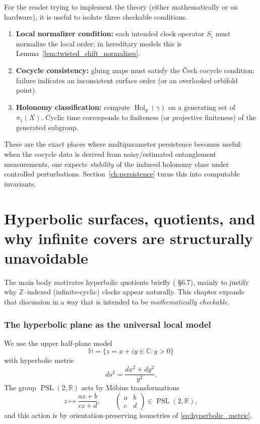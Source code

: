\documentclass[11pt,oneside]{amsbook}
\numberwithin{equation}{section}
\theoremstyle{plain}
\theoremstyle{definition}
\theoremstyle{remark}
\newcommand{\HH}{\mathbb{H}}
\newcommand{\Z}{\mathbb{Z}}
\newcommand{\R}{\mathbb{R}}
\newcommand{\C}{\mathbb{C}}
\DeclareMathOperator{\Hol}{\mathrm{Hol}}
\DeclareMathOperator{\PSL}{\mathrm{PSL}}
\begin{document}
For the reader trying to implement the theory (either mathematically or on hardware), it is useful to isolate three checkable conditions.

\begin{enumerate}
\item \textbf{Local normalizer condition:} each intended clock operator $S_i$ must normalize the local order; in hereditary models this is Lemma~\ref{lem:twisted_shift_normalizes}.
\item \textbf{Cocycle consistency:} gluing maps must satisfy the \v{C}ech cocycle condition; failure indicates an inconsistent surface order (or an overlooked orbifold point).
\item \textbf{Holonomy classification:} compute $\Hol_g(\gamma)$ on a generating set of $\pi_1(X)$.
Cyclic time corresponds to finiteness (or projective finiteness) of the generated subgroup.
\end{enumerate}

These are the exact places where multiparameter persistence becomes useful:
when the cocycle data is derived from noisy/estimated entanglement measurements, one expects \emph{stability} of the induced holonomy class under controlled perturbations.
Section~\ref{ch:persistence} turns this into computable invariants.

\chapter{Hyperbolic surfaces, quotients, and why infinite covers are structurally unavoidable}

\label{ch:hyperbolic}


The  main body motivates hyperbolic quotients briefly ( \S6.7), mainly to justify why $\Z$--indexed (infinite-cyclic) clocks appear naturally.
This chapter expands that discussion in a way that is intended to be \emph{mathematically checkable}.

\subsection{The hyperbolic plane as the universal local model}
\label{sec:H_model}
\label{sec:hyperbolic_plane}

We use the upper half-plane model
\[
\HH=\{z=x+iy\in\C : y>0\}
\]
with hyperbolic metric
\begin{equation}
\label{eq:hyperbolic_metric}
ds^2=\frac{dx^2+dy^2}{y^2}.
\end{equation}
The group $\PSL(2,\R)$ acts by Möbius transformations
\[
z\longmapsto \frac{az+b}{cz+d},\qquad \begin{pmatrix}a&b\\c&d\end{pmatrix}\in \PSL(2,\R),
\]
and this action is by orientation-preserving isometries of \eqref{eq:hyperbolic_metric}.
\end{document}
